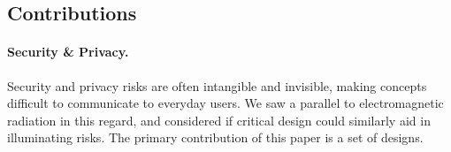 %
%

\subsection{Contributions}

\paragraph{Security \& Privacy.} Security and privacy risks are often intangible and invisible, making concepts difficult to communicate to everyday users. We saw a parallel to electromagnetic radiation in this regard, and considered if critical design could similarly aid in illuminating risks. The primary contribution of this paper is a set of designs.

